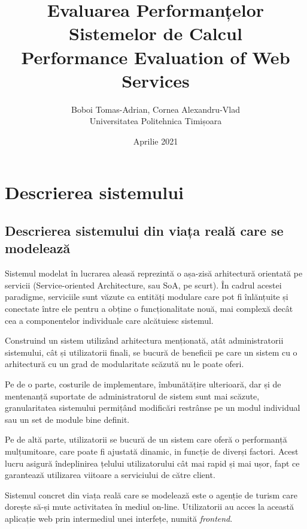 \documentclass[12pt]{article}
\author{Boboi Tomas-Adrian, Cornea Alexandru-Vlad\\ Universitatea Politehnica Timișoara}
\date{Aprilie 2021}
\title{Evaluarea Performanțelor Sistemelor de Calcul\\ Performance Evaluation of Web Services}
\begin{document}
    \maketitle
    \thispagestyle{empty}
    \pagebreak

    \tableofcontents
    \pagebreak

    \section{Descrierea sistemului}

        \subsection{Descrierea sistemului din viața reală care se modelează}
            Sistemul modelat în lucrarea aleasă reprezintă o așa-zisă arhitectură orientată pe servicii (Service-oriented Architecture, sau SoA, pe scurt). În cadrul acestei paradigme, serviciile sunt văzute ca entități modulare care pot fi înlănțuite și conectate între ele pentru a obține o funcționalitate nouă, mai complexă decât cea a componentelor individuale care alcătuiesc sistemul.

            Construind un sistem utilizând arhitectura menționată, atât administratorii sistemului, cât și utilizatorii finali, se bucură de beneficii pe care un sistem cu o arhitectură cu un grad de modularitate scăzută nu le poate oferi.

            Pe de o parte, costurile de implementare, îmbunătățire ulterioară, dar și de mentenanță suportate de administratorul de sistem sunt mai scăzute, granularitatea sistemului permițând modificări restrânse pe un modul individual sau un set de module bine definit.

            Pe de altă parte, utilizatorii se bucură de un sistem care oferă o per\-for\-man\-ță mulțumitoare, care poate fi ajustată dinamic, in funcție de diverși factori. Acest lucru asigură îndeplinirea țelului utilizatorului cât mai rapid și mai ușor, fapt ce garantează utilizarea viitoare a serviciului de către client.

            \vspace{\baselineskip}
            \noindent
            Sistemul concret din viața reală care se modelează este o agenție de turism care dorește să-și mute activitatea în mediul on-line. Utilizatorii au acces la această aplicație web prin intermediul unei interfețe, numită \textit{frontend}.
\end{document}
